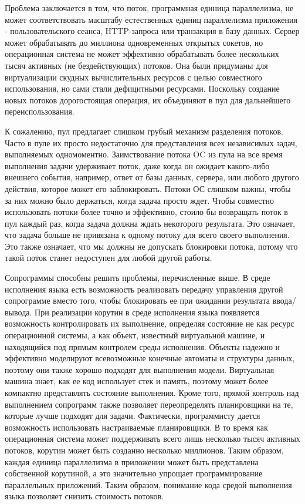 	Проблема заключается в том, что поток, программная единица параллелизма, не может соответствовать масштабу
	естественных единиц параллелизма приложения - пользовательского сеанса, HTTP-запроса или транзакция в базу
	данных. Сервер может обрабатывать до миллиона одновременных открытых сокетов, но операционная система не
	может эффективно обрабатывать более нескольких тысяч активных (не бездействующих) потоков. 
	Она были придуманы для виртуализации скудных вычислительных ресурсов с целью совместного
	использования, но сами стали дефицитными ресурсами. Поскольку создание новых потоков дорогостоящая операция,
	их объединяют в пул для дальнейшего переиспользования. 
	
	К сожалению, пул предлагает слишком грубый механизм разделения потоков. Часто в пуле  их просто недостаточно
	для представления всех независимых задач, выполняемых одномоментно. Заимствование потока OC из
	пула на все время выполнения задачи удерживает поток, даже когда он ожидает какого-либо внешнего события,
	например, ответ от базы данных, сервера, или любого другого действия, которое может его заблокировать.
	Потоки ОС слишком важны, чтобы за них можно было держаться, когда задача просто ждет. Чтобы совместно
	использовать потоки более точно и эффективно, стоило бы возвращать поток в пул каждый раз, когда задача
	должна ждать некоторого результата. Это означает, что задача больше не привязана к одному потоку для всего
	своего выполнения. Это также означает, что мы должны не допускать блокировки потока, потому что такой
	поток станет недоступен для любой другой работы.
	\par
	Сопрограммы способны решить проблемы, перечисленные выше. В среде исполнения языка есть возможность реализовать
	передачу управления другой сопрограмме вместо того, чтобы блокировать ее при ожидании результата ввода/ вывода.
	При реализации корутин в среде исполнения языка появляется возможность контролировать их выполнение, определяя состояние 
	не как ресурс операционной системы, а как объект, известный виртуальной машине, и находящийся под прямым контролем среды
	исполнения. Объекты надежно и эффективно моделируют всевозможные конечные автоматы и структуры данных, поэтому
	они также хорошо подходят для выполнения модели. Виртуальная машина знает, как ее код использует стек и память, поэтому может более компактно представлять состояние выполнения.
	Кроме того, прямой контроль над выполнением сопрограмм также позволяет переопределять планировщики на те, которые
	лучше подходят для задачи. Фактически, программисту дается возможность использовать настраиваемые планировщики. 
	В то время как операционная система может поддерживать всего лишь несколько тысяч активных потоков, корутин может быть
	созданно несколько миллионов. Таким образом, каждая единица параллелизма в приложении может быть представлена ​​собственной 
	корутиной, а это значительно упрощает программирование параллельных приложений. Таким
	образом, понимание кода средой выполнения языка позволяет снизить стоимость потоков.
	
